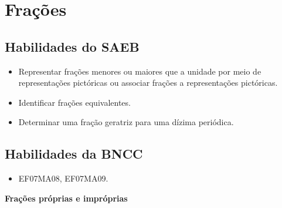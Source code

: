 

\chapter{Frações}

\section{Habilidades do SAEB }
\begin{itemize}
\item Representar frações menores ou maiores que a
unidade por meio de representações pictóricas ou associar frações a
representações pictóricas.
\item
  Identificar frações equivalentes.
\item
  Determinar uma fração geratriz para uma dízima periódica.
\end{itemize}

\section{Habilidades da BNCC }
\begin{itemize}
\item EF07MA08, EF07MA09.
\end{itemize}


\textbf{Frações próprias e impróprias}

